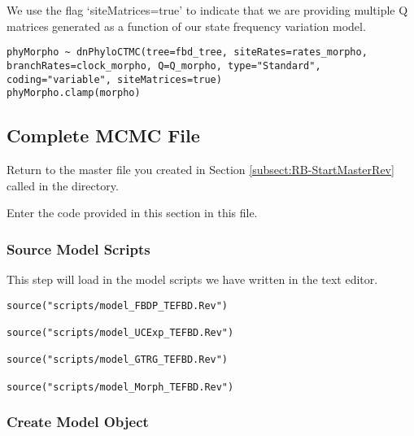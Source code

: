 We use the flag `siteMatrices=true' to indicate that we are providing multiple Q matrices generated as a function of our state frequency variation model. \par


{\tt \begin{snugshade*}
\begin{lstlisting}
phyMorpho ~ dnPhyloCTMC(tree=fbd_tree, siteRates=rates_morpho, branchRates=clock_morpho, Q=Q_morpho, type="Standard", coding="variable", siteMatrices=true)
phyMorpho.clamp(morpho)
\end{lstlisting}
\end{snugshade*}}


\bigskip

\subsection{Complete MCMC File}\label{subsect:RB-CompleteMCMC}

{\begin{framed}
Return to the master \Rev file you created in Section \ref{subsect:RB-StartMasterRev} called {\textcolor{red}{}} in the  directory.

Enter the \Rev code provided in this section in this file.
\end{framed}}

\medskip
\subsubsection{Source Model Scripts}\label{subsub:RB-SourceMods}

This step will load in the model scripts we have written in the text editor.

{\tt \begin{snugshade*}
\begin{lstlisting}
source("scripts/model_FBDP_TEFBD.Rev")

source("scripts/model_UCExp_TEFBD.Rev")

source("scripts/model_GTRG_TEFBD.Rev")

source("scripts/model_Morph_TEFBD.Rev")
\end{lstlisting}
\end{snugshade*}}



\medskip
\subsubsection{Create Model Object}\label{subsub:RB-ModObj}



